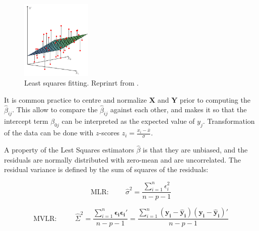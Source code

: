 \documentclass[12pt]{article}
\begin{document}
{%


\begin{figure}[h]
	\centering
	\includegraphics[width=0.3\textwidth]{images/LeastSquares.png}
	\caption{Least squares fitting. Reprinrt from \cite{ElementsStatisticalLearning}.}
	\label{fig:LeastSquares}
\end{figure}

It is common practice to centre and normalize $\mathbf{X}$ and $\mathbf{Y}$ prior to computing the $\hat \beta_{ij}$. This allow to compare the $\hat \beta_{ij}$ against each other, and makes it so that the intercept term $\beta_{0j}$ can be interpreted as the expected value of $y_{j}$. Transformation of the data can be done with $z$-scores $z_{i}=\frac{x_{i}-\bar x}{\sigma}$.

A property of the Lest Squares estimators $\hat \beta$ is that they are unbiased, and the residuals are normally distributed with zero-mean and are uncorrelated. The residual variance is defined by the sum of squares of the residuals:

\begin{equation}
\text{MLR:} \hspace{1cm} \hat \sigma^{2} = \frac{\sum^{n}_{i=1}\epsilon^{2}_{i}}{n-p-1}
\end{equation}

\begin{equation}
\text{MVLR:} \hspace{1cm} \ \hat \Sigma^{2} = \frac{\sum^{n}_{i=1}\mathbf{\epsilon_{i}}\mathbf{\epsilon_{i}}'}{n-p-1} = \frac{\sum^{n}_{i=1}(\mathbf{y_{i}}-\mathbf{\hat y_{i}})(\mathbf{y_{i}}-\mathbf{\hat y_{i}})'}{n-p-1}
\end{equation}

}
\end{document}
